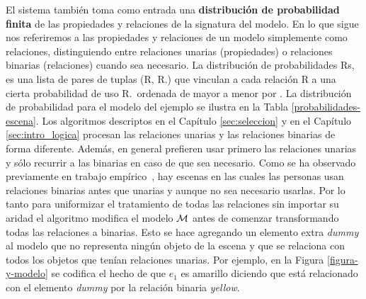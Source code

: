 El sistema tambi\'en toma como entrada una \textbf{distribuci\'on de probabilidad finita} de las propiedades y relaciones de la signatura del modelo. En lo que sigue nos referiremos a las propiedades y relaciones de un modelo simplemente como relaciones, distinguiendo entre relaciones unarias (propiedades) o relaciones binarias (relaciones) cuando sea necesario. La distribuci\'on de probabilidades Rs, es una lista de pares de tuplas (R, R.\puse) que vinculan a cada relaci\'on R a una cierta probabilidad de uso R.\puse\ ordenada de mayor a menor por \puse. La distribuci\'on de probabilidad para el modelo del ejemplo se ilustra en la Tabla \ref{probabilidades-escena}.  Los algoritmos descriptos en el Cap\'itulo \ref{sec:seleccion} y en el Cap\'itulo \ref{sec:intro_logica} procesan las relaciones unarias y las relaciones binarias de forma diferente. Adem\'as, en general prefieren usar primero las relaciones unarias y s\'olo recurrir a las binarias en caso de que sea necesario. Como se ha observado previamente en trabajo emp\'irico~\cite{viet:gene11}, hay escenas en las cuales las personas usan relaciones binarias antes que unarias y aunque no sea necesario usarlas. Por lo tanto para uniformizar el tratamiento de todas las relaciones sin importar su aridad el algoritmo modifica el modelo $\mathcal{M}$ antes de comenzar transformando todas las relaciones a binarias. Esto se hace agregando un elemento extra \emph{dummy} al modelo que no representa ning\'un objeto de la escena y que se relaciona con todos los objetos que ten\'ian relaciones unarias. Por ejemplo, en la Figura \ref{figura-y-modelo} se codifica el hecho de que $e_1$ es amarillo diciendo que est\'a relacionado con el elemento \emph{dummy} por la relaci\'on binaria \emph{yellow}. 

